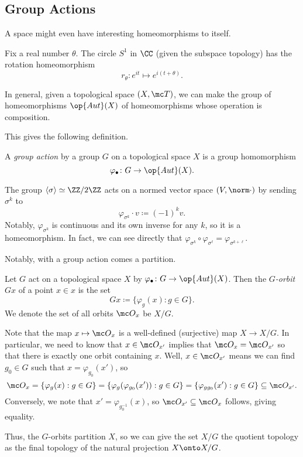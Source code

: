 \documentclass[../notes.tex]{subfiles}
\begin{document}
\subsection{Group Actions}
A space might even have interesting homeomorphisms to itself.
\begin{example}
	Fix a real number $\theta$. The circle $S^1$ in $\CC$ (given the subspace topology) has the rotation homeomorphism
	\[r_\theta\colon e^{it}\mapsto e^{i(t+\theta)}.\]
\end{example}
\begin{remark}
	In general, given a topological space $(X,\mc T)$, we can make the group of homeomorphisms $\op{Aut}(X)$ of homeomorphisms whose operation is composition.
\end{remark}
This gives the following definition.
\begin{definition}
	A \textit{group action} by a group $G$ on a topological space $X$ is a group homomorphism
	\[\varphi_\bullet\colon G\to\op{Aut}(X).\]
\end{definition}
\begin{example}
	The group $\langle\sigma\rangle\simeq\ZZ/2\ZZ$ acts on a normed vector space $(V,\norm\cdot)$ by sending $\sigma^k$ to
	\[\varphi_{\sigma^k}\cdot v\coloneqq(-1)^kv.\]
	Notably, $\varphi_{\sigma^k}$ is continuous and its own inverse for any $k$, so it is a homeomorphism. In fact, we can see directly that $\varphi_{\sigma^k}\circ\varphi_{\sigma^\ell}=\varphi_{\sigma^{k+\ell}}$.
\end{example}
Notably, with a group action comes a partition.
\begin{definition}[Orbit]
	Let $G$ act on a topological space $X$ by $\varphi_\bullet\colon G\to\op{Aut}(X)$. Then the \textit{$G$-orbit} $Gx$ of a point $x\in x$ is the set
	\[Gx\coloneqq\{\varphi_g(x):g\in G\}.\]
	We denote the set of all orbits $\mc O_x$ be $X/G$.
\end{definition}
\begin{remark}
	Note that the map $x\mapsto\mc O_x$ is a well-defined (surjective) map $X\to X/G$. In particular, we need to know that $x\in\mc O_{x'}$ implies that $\mc O_x=\mc O_{x'}$ so that there is exactly one orbit containing $x$. Well, $x\in\mc O_{x'}$ means we can find $g_0\in G$ such that $x=\varphi_{g_0}(x')$, so
	\[\mc O_x=\{\varphi_g(x):g\in G\}=\{\varphi_g(\varphi_{g_0}(x')):g\in G\}=\{\varphi_{gg_0}(x'):g\in G\}\subseteq\mc O_{x'}.\]
	Conversely, we note that $x'=\varphi_{g_0^{-1}}(x)$, so $\mc O_{x'}\subseteq\mc O_x$ follows, giving equality.
\end{remark}
Thus, the $G$-orbits partition $X$, so we can give the set $X/G$ the quotient topology as the final topology of the natural projection $X\onto X/G$.
\end{document}
